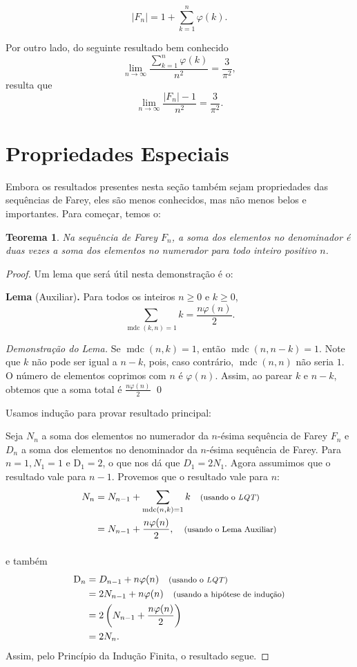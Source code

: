 \documentclass{hipatia}
\newtheorem*{theorem*}{Teorema}
\theoremstyle{definition} %
\begin{document}
$$
\left|F_n\right| = 1 + \sum_{k=1}^{n} \varphi(k).
$$

Por outro lado, do seguinte resultado bem conhecido 
$$\lim _{n \rightarrow \infty} \frac{\sum_{k=1}^{n} \varphi(k)}{n^2}=\frac{3}{\pi^2},$$ 
resulta que 
$$\lim _{n \rightarrow \infty} \frac{\left|F_n\right|-1}{n^2}=\frac{3}{\pi^2}.$$



\section{Propriedades Especiais}

Embora os resultados presentes nesta seção também sejam propriedades das sequências de Farey, eles são menos conhecidos, mas não menos belos e importantes. Para começar, temos o:
\begin{theorem*}
Na sequência de Farey \(F_{n}\), a soma dos elementos no denominador é duas vezes a soma dos elementos no numerador para todo inteiro positivo \(n\).
\end{theorem*} 
\begin{proof}
Um lema que será útil nesta demonstração é o:

\noindent \textbf{Lema} (Auxiliar)\textbf{.}
    Para todos os inteiros \(n \geq 0\) e \(k \geq 0\),
\[
\sum_{\operatorname{mdc}(k, n)=1} k=\frac{n \varphi(n)}{2}.
\]

\noindent \textit{Demonstração do Lema.} Se \(\operatorname{mdc}(n, k)=1\), então \(\operatorname{mdc}(n, n-k)=1\). Note que \(k\) não pode ser igual a \(n-k\), pois, caso contrário, \(\operatorname{mdc}(n, n)\) não seria \(1\). O número de elementos coprimos com \(n\) é \(\varphi(n)\). Assim, ao parear \(k\) e \(n-k\), obtemos que a soma total é \(\frac{n \varphi(n)}{2}\)
\qed

    Usamos indução para provar resultado principal:
    
    Seja \(N_{n}\) a soma dos elementos no numerador da \(n\)-ésima sequência de Farey \(F_{n}\) e \(D_{n}\) a soma dos elementos no denominador da \(n\)-ésima sequência de Farey. Para \(n=1, N_{1}=1\) e \(\mathrm{D}_{1}=2\), o que nos dá que
\(D_{1}=2 N_{1}\). Agora assumimos que o resultado vale para \(n-1\). Provemos que o resultado vale para \(n\):
\begin{align*}
N_{n} &= N_{n-1} + \sum_{\operatorname{mdc}(n, k) = 1} k \quad \text{\footnotesize (usando o \textit{LQT})} \\
&= N_{n-1} + \frac{n \varphi(n)}{2}, \quad \text{\footnotesize (usando o Lema Auxiliar)} \\[10pt]
\end{align*}
e também
\begin{align*}
\mathrm{D}_{n} &= D_{n-1} + n \varphi(n) \quad \text{\footnotesize (usando o \textit{LQT})} \\
&= 2 N_{n-1} + n \varphi(n) \quad \text{\footnotesize (usando a hipótese de indução)} \\
&= 2 \left( N_{n-1} + \frac{n \varphi(n)}{2} \right) \\
&= 2 N_{n}.
\end{align*}
Assim, pelo Princípio da Indução Finita, o resultado segue.
\end{proof} 
\end{document}
